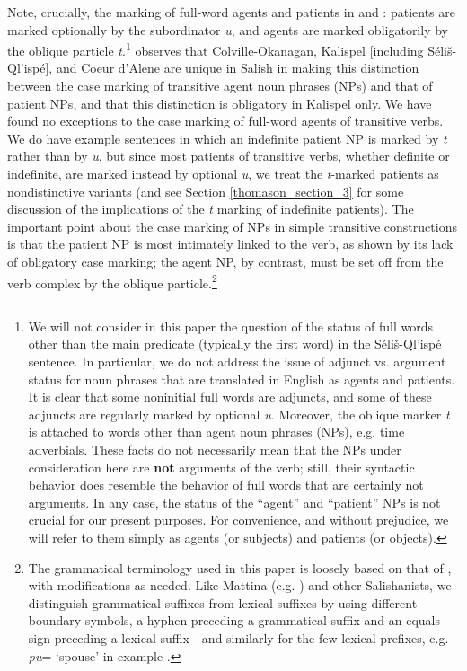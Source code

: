 \documentclass[output=paper,colorlinks,citecolor=brown]{langscibook}
\begin{document}
  Note, crucially, the marking of full-word agents and patients in 
  and : patients are marked optionally by the subordinator
  \emph{{\textltilde}u}, and agents are marked obligatorily by the
  oblique particle \emph{t}.\footnote{We will not consider in this
  paper the question of the status of full words other than the main
  predicate (typically the first word) in the S\'eli\v{s}-Ql'isp\'e
  sentence.  In particular, we do not address the issue of adjunct
  vs. argument status for noun phrases that are translated in English
  as agents and patients.  It is clear that some noninitial full
  words are adjuncts, and some of these adjuncts are regularly marked
  by optional \emph{{\textltilde}u}.  Moreover, the oblique marker
  \emph{t} is attached to words other than agent noun phrases (NPs),
  e.g.  time adverbials.  These facts do not necessarily mean that
  the NPs under consideration here are \textbf{not} arguments of the
  verb; still, their syntactic behavior does resemble the behavior of
  full words that are certainly not arguments.  In any case, the
  status of the ``agent'' and ``patient'' NPs is not crucial for our
  present purposes.  For convenience, and without prejudice, we will
  refer to them simply as agents (or subjects) and patients (or
  objects).  } \citet[52--53]{Kroeber:1999} observes that Colville-Okanagan,
  Kalispel [including S\'eli\v{s}-Ql'isp\'e], and Coeur d'Alene are
  unique in Salish in making this distinction between the case
  marking of transitive agent noun phrases (NPs) and that of patient
  NPs, and that this distinction is obligatory in Kalispel only.  We
  have found no exceptions to the case marking of full-word agents of
  transitive verbs.  We do have example sentences in which an
  indefinite patient NP is marked by \emph{t} rather than by \emph{{\textltilde}u}, but since most patients of transitive verbs,
  whether definite or indefinite, are marked instead by optional \emph{{\textltilde}u}, we treat the \emph{t}-marked patients as
  nondistinctive variants (and see Section \ref{thomason_section_3} for some discussion of the
  implications of the \emph{t} marking of indefinite patients).  The
  important point about the case marking of NPs in simple transitive
  constructions is that the patient NP is most intimately linked to
  the verb, as shown by its lack of obligatory case marking; the
  agent NP, by contrast, must be set off from the verb complex by the
  oblique particle.\footnote{The grammatical terminology used in
  this paper is loosely based on that of \citet{Carlson:1972}, with
  modifications as needed.  Like Mattina (e.g. \citealt{Mattina:1987}) and other
  Salishanists, we distinguish grammatical suffixes from lexical
  suffixes by using different boundary symbols, a hyphen preceding a
  grammatical suffix and an equals sign preceding a lexical
  suffix---and similarly for the few lexical prefixes, e.g. \emph{pu\textglotstop}= `spouse' in example .}
\end{document}

